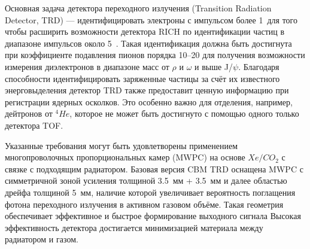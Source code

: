 Основная задача детектора переходного излучения (Transition Radiation Detector, TRD) --- идентифицировать электроны с импульсом более 1~\GeVoverC для того чтобы расширить возможности детектора RICH по идентификации частиц в диапазоне импульсов около 5~\GeVoverC.
Такая идентификация должна быть достигнута при коэффициенте подавления пионов порядка 10--20 для получения возможности измерения диэлектронов в диапазоне масс от $\rho$ и $\omega$ и выше J/$\psi$.
Благодаря способности идентифицировать заряженные частицы за счёт их известного энерговыделения детектор TRD также предоставит ценную информацию при регистрации ядерных осколков.
Это особенно важно для отделения, например, дейтронов от $ ^{4}He $, которое не может быть достигнуто с помощью одного только детектора TOF.


Указанные требования могут быть удовлетворены применением многопроволочных пропорциональных камер (MWPC) на основе $ Xe/CO_{2} $ с связке с подходящим радиатором. Базовая версия CBM TRD оснащена MWPC с симметричной зоной усиления толщиной 3.5~мм + 3.5~мм и далее областью дрейфа толщиной 5~мм, наличие которой увеличивает вероятность поглащения фотона переходного излучения в активном газовом объёме. Такая геометрия обеспечивает эффективное и быстрое формирование выходного сигнала
Высокая эффективность детектора достигается минимизацией материала между радиатором и газом.


